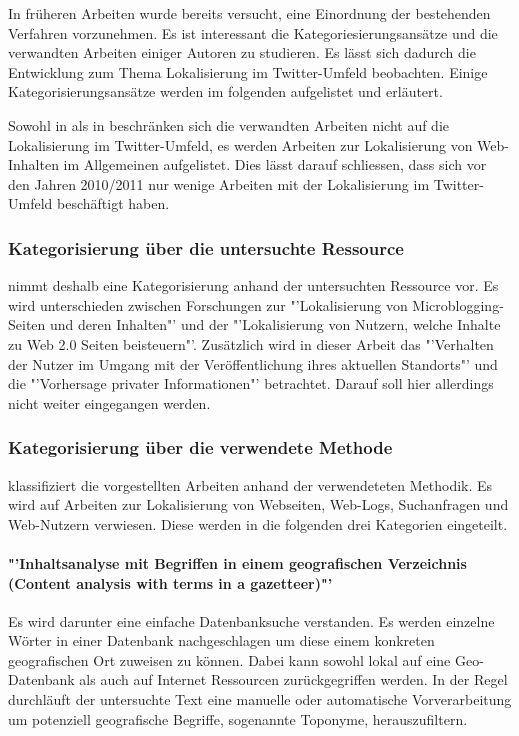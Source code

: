 		In früheren Arbeiten wurde bereits versucht, eine Einordnung der bestehenden Verfahren vorzunehmen. 
		Es ist interessant die Kategoriesierungsansätze und die verwandten Arbeiten einiger Autoren zu studieren.
		Es lässt sich dadurch die Entwicklung zum Thema Lokalisierung im Twitter-Umfeld beobachten. 
		Einige Kategorisierungsansätze werden im folgenden aufgelistet und erläutert.

		Sowohl in \cite{Hecht2011} als in \cite{Cheng2010} beschränken sich die verwandten Arbeiten nicht auf die Lokalisierung im Twitter-Umfeld, es werden Arbeiten zur Lokalisierung von Web-Inhalten im Allgemeinen aufgelistet. 
		Dies lässt darauf schliessen, dass sich vor den Jahren 2010/2011 nur wenige Arbeiten mit der Lokalisierung im Twitter-Umfeld beschäftigt haben.  
		
		\subsubsection{Kategorisierung über die untersuchte Ressource}
		\cite{Hecht2011} nimmt deshalb eine Kategorisierung anhand der untersuchten Ressource vor. 
		Es wird unterschieden zwischen Forschungen zur "'Lokalisierung von Microblogging-Seiten und deren Inhalten"' und der "'Lokalisierung von Nutzern, welche Inhalte zu Web 2.0 Seiten beisteuern"'. 
		Zusätzlich wird in dieser Arbeit das "'Verhalten der Nutzer im Umgang mit der Veröffentlichung ihres aktuellen Standorts"' und die "'Vorhersage privater Informationen"' betrachtet. Darauf soll hier allerdings nicht weiter eingegangen werden.      

		\subsubsection{Kategorisierung über die verwendete Methode}

		\cite{Cheng2010} klassifiziert die vorgestellten Arbeiten anhand der verwendeteten Methodik. 
		Es wird auf Arbeiten zur Lokalisierung von Webseiten, Web-Logs, Suchanfragen und Web-Nutzern verwiesen. 
		Diese werden in die folgenden drei Kategorien eingeteilt.

		\paragraph*{"'Inhaltsanalyse mit Begriffen in einem geografischen Verzeichnis (Content analysis with terms in a gazetteer)"'}  
		Es wird darunter eine einfache Datenbanksuche verstanden. 
		Es werden einzelne Wörter in einer Datenbank nachgeschlagen um diese einem konkreten geografischen Ort zuweisen zu können.
		Dabei kann sowohl lokal auf eine Geo-Datenbank als auch auf Internet Ressourcen zurückgegriffen werden.  
		In der Regel durchläuft der untersuchte Text eine manuelle oder automatische Vorverarbeitung um potenziell geografische Begriffe, sogenannte Toponyme, herauszufiltern. 

